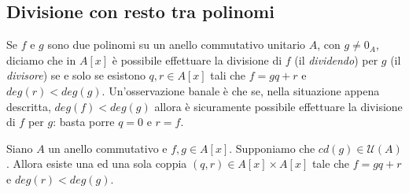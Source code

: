 \subsection{Divisione con resto tra polinomi}
Se $f$ e $g$ sono due polinomi su un anello commutativo unitario $A$, con $g \neq 0_{A}$, diciamo che in $A[x]$ è possibile effettuare la divisione di $f$ (il \textit{dividendo}) per $g$ (il \textit{divisore}) se e solo se esistono $q,r \in A[x]$ tali che $f=gq+r$ e $deg (r) < deg(g)$. Un'osservazione banale è che se, nella situazione appena descritta, $deg(f) < deg(g)$ allora è sicuramente possibile effettuare la divisione di $f$ per $g$: basta porre $q = 0$ e $r=f$.



\begin{teorbox}
	Siano $A$ un anello commutativo e $f,g \in A[x]$. Supponiamo che $cd(g) \in \mathcal{U}(A)$. Allora esiste una ed una sola coppia $(q,r) \in A[x] \times A[x]$ tale che $f=gq+r$ e $deg(r) < deg(g)$.
\end{teorbox}

